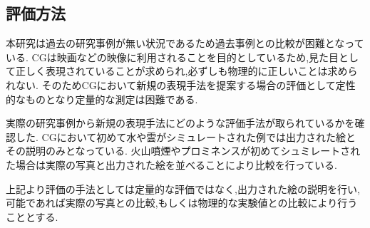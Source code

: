 \subsection{評価方法}
本研究は過去の研究事例が無い状況であるため過去事例との比較が困難となっている.
CGは映画などの映像に利用されることを目的としているため,見た目として正しく表現されていることが求められ,必ずしも物理的に正しいことは求められない.
そのためCGにおいて新規の表現手法を提案する場合の評価として定性的なものとなり定量的な測定は困難である.

実際の研究事例から新規の表現手法にどのような評価手法が取られているかを確認した.
CGにおいて初めて水\cite{Foster1996}や雲\cite{Gardner1985}がシミュレートされた例では出力された絵とその説明のみとなっている.
火山噴煙\cite{Mizuno2003}やプロミネンス\cite{Ishikawa}が初めてシュミレートされた場合は実際の写真と出力された絵を並べることにより比較を行っている.

上記より評価の手法としては定量的な評価ではなく,出力された絵の説明を行い,可能であれば実際の写真との比較,もしくは物理的な実験値との比較により行うこととする.
